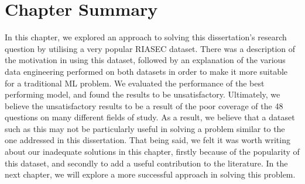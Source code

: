 \section{Chapter Summary}

In this chapter, we explored an approach to solving this dissertation's research question by 
utilising a very popular RIASEC dataset.
There was a description of the motivation in using this dataset, followed by an explanation of the various data engineering 
performed on both datasets in order to make it more suitable for a traditional ML problem.
We evaluated the performance of the best performing model, and found the results to be unsatisfactory.
Ultimately, we believe the unsatisfactory results to be a result of the poor coverage of the 48 questions on many different fields of study.
As a result, we believe that a dataset such as this may not be particularly useful in solving a problem similar to the one addressed in this dissertation.
That being said, we felt it was worth writing about our inadequate solutions in this chapter, 
firstly because of the popularity of this dataset,
and secondly to add a useful contribution to the literature.
In the next chapter, we will explore a more successful approach in solving this problem.
